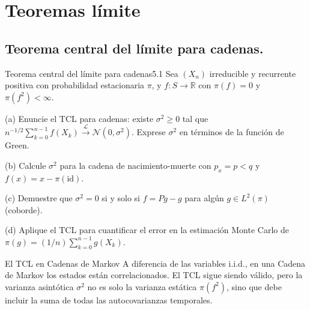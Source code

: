 \documentclass[10pt,a4paper]{article}
\begin{document}
\newpage 
\section{Teoremas límite}


\subsection{Teorema central del límite para cadenas.}


\vspace{3mm}

\begin{ejercicio}{Teorema central del límite para cadenas}{5.1}
    Sea $(X_n)$ irreducible y recurrente positiva con probabilidad estacionaria $\pi$, y $f : S \to \mathbb{R}$ con $\pi(f) = 0$ y $\pi(f^2) < \infty$.
    
    
    (a) Enuncie el TCL para cadenas: existe $\sigma^2 \ge 0$ tal que $n^{-1/2} \sum_{k=0}^{n-1} f(X_k) \xrightarrow{\mathcal{L}} \mathcal{N}(0, \sigma^2)$. Exprese $\sigma^2$ en términos de la función de Green.

    
    (b) Calcule $\sigma^2$ para la cadena de nacimiento-muerte con $p_x = p < q$ y $f(x) = x - \pi(\text{id})$.
    

    (c) Demuestre que $\sigma^2 = 0$ si y solo si $f = Pg - g$ para algún $g \in L^2(\pi)$ (coborde).
    

    (d) Aplique el TCL para cuantificar el error en la estimación Monte Carlo de $\pi(g) = (1/n) \sum_{k=0}^{n-1} g(X_k)$.
\end{ejercicio}

\vspace{2mm}

\begin{nota}{El TCL en Cadenas de Markov}
    A diferencia de las variables i.i.d., en una Cadena de Markov los estados están correlacionados. El TCL sigue siendo válido, pero la varianza asintótica $\sigma^2$ no es solo la varianza estática $\pi(f^2)$, sino que debe incluir la suma de todas las autocovarianzas temporales.
\end{nota}
\end{document}
